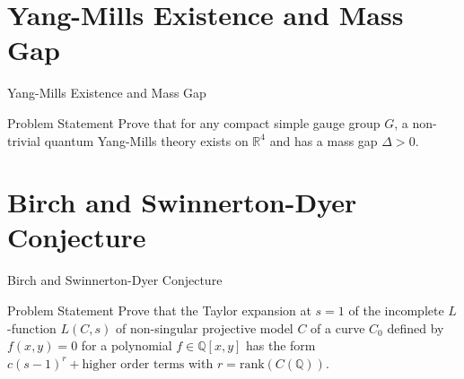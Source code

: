 \documentclass{beamer}
\newcommand{\Real}{\mathbb{R}}
\newcommand{\Rational}{\mathbb{Q}}
\begin{document}
  \section{Yang-Mills Existence and Mass Gap}
  \begin{frame}{Yang-Mills Existence and Mass Gap}
      \begin{block}{Problem Statement}
          Prove that for any compact simple gauge group $G$, a non-trivial
          quantum Yang-Mills theory exists on $\Real^4$ and has a mass gap
          $\Delta > 0$.
      \end{block}
  \end{frame}

  \section{Birch and Swinnerton-Dyer Conjecture}
  \begin{frame}{Birch and Swinnerton-Dyer Conjecture}
      \begin{block}{Problem Statement}
          Prove that the Taylor expansion at $s=1$ of the incomplete
          $L$-function $L(C, s)$ of non-singular projective model $C$ of a
          curve $C_0$ defined by $f(x, y) = 0$ for a polynomial
          $f \in \Rational [x, y]$ has the form
          $c(s-1)^r + \text{higher order terms}$ with
          $r = \mathrm{rank}(C(\Rational))$.
      \end{block}
  \end{frame}
\end{document}
